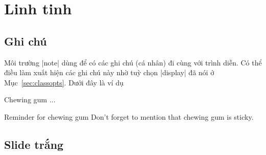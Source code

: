 
\section{Linh tinh}


\subsection{\texorpdfstring{Ghi chú}{Ghi chu}}\label{sec:notes}

Môi trường |note| dùng để có các ghi chú (cá nhân) đi cùng với trình diễn.
Có thể điều làm xuất hiện các ghi chú này nhờ tuỳ chọn |display|
đã nói ở Mục~\ref{sec:classopts}. Dưới đây là ví dụ
\begin{example}
 \begin{slide}{Chewing gum}
 ...
 \end{slide}
 \begin{note}{Reminder for chewing gum}
   Don't forget to mention that chewing gum is sticky.
 \end{note}
\end{example}


\subsection{Slide \texorpdfstring{trắng}{trang}}

\label{sec:emptyslides}

